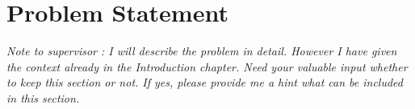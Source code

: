 \chapter{Problem Statement}
\textit{Note to supervisor : I will describe the problem in detail. However I have given the context already in the Introduction chapter. Need your valuable input whether to keep this section or not. If yes, please provide me a hint what can be included in this section. }